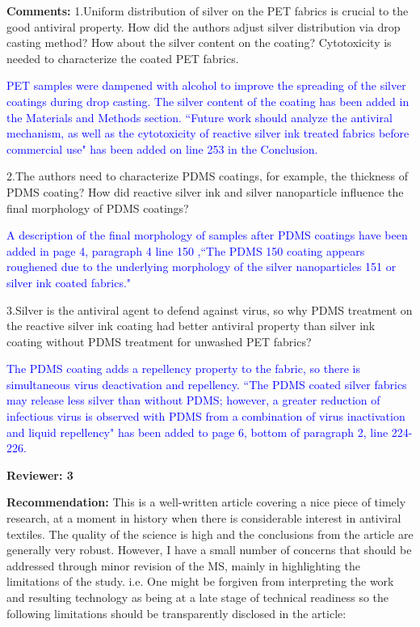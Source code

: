 \documentclass[12pt]{letter}
\newcommand{\blue}[1]{\textcolor{blue}{#1}} %
\begin{document}
\textbf{Comments:} 
1.Uniform distribution of silver on the PET fabrics is crucial to the good antiviral property. How did the authors adjust silver distribution via drop casting method? How about the silver content on the coating? Cytotoxicity is needed to characterize the coated PET fabrics.

\blue{PET samples were dampened with alcohol to improve the spreading of the silver coatings during drop casting. The silver content of the coating has been added in the Materials and Methods section. ``Future work should analyze the antiviral mechanism, as well as the cytotoxicity of reactive silver ink treated fabrics before
commercial use" has been added on line 253 in the Conclusion. }

2.The authors need to characterize PDMS coatings, for example, the thickness of PDMS coating? How did reactive silver ink and silver nanoparticle influence the final morphology of PDMS coatings?

\blue{A description of the final morphology of samples after PDMS coatings have been added in page 4, paragraph 4 line 150 ,``The PDMS 150
coating appears roughened due to the underlying morphology of the silver nanoparticles 151
or silver ink coated fabrics." }

3.Silver is the antiviral agent to defend against virus, so why PDMS treatment on the reactive silver ink coating had better antiviral property than silver ink coating without PDMS treatment for unwashed PET fabrics?

\blue{The PDMS coating adds a repellency property to the fabric, so there is simultaneous virus deactivation and repellency. ``The PDMS coated silver 
fabrics may release less silver than without PDMS; however, a greater reduction of 
infectious virus is observed with PDMS from a combination of virus inactivation and 
liquid repellency" has been added to page 6, bottom of paragraph 2, line 224-226.}

\newpage
\textbf{Reviewer: 3}

\textbf{Recommendation:} This is a well-written article covering a nice piece of timely research, at a moment in history when there is considerable interest in antiviral textiles. The quality of the science is high and the conclusions from the article are generally very robust. However, I have a small number of concerns that should be addressed through minor revision of the MS, mainly in highlighting the limitations of the study. i.e. One might be forgiven from interpreting the work and resulting technology as being at a late stage of technical readiness so the following limitations should be transparently disclosed in the article:
\end{document}
